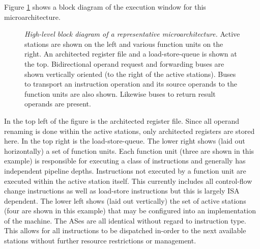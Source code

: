 \documentclass{book}
\begin{document}
Figure \ref{fig:overview} shows a block diagram
of the execution window for this microarchitecture.
%
%
\begin{figure}
\centerline{}
\caption[High-level block diagram of a representative microarchitecture]
{{\em High-level block diagram of a representative microarchitecture.}
Active stations are shown on the left and various function
units on the right.  An architected register file and a
load-store-queue is shown at the top.
Bidirectional operand request and forwarding buses are shown
vertically oriented (to the right of the active stations).
Buses to transport an instruction operation and its source operands
to the function units are also shown. 
Likewise buses to return result operands are present.}
\label{fig:overview}
\end{figure}
%
%
In the top left of the figure is the architected register file.
Since all operand renaming is done within the active stations,
only architected registers are stored here.
In the top right is the load-store-queue.
The lower right shows (laid out horizontally) a set of function units.
Each function unit (three are shown in this example)
is responsible for executing a class of
instructions and generally has independent pipeline depths.
Instructions not executed by a function unit
are executed within the active station itself.  This currently
includes all control-flow change instructions as well as load-store
instructions but this is largely ISA dependent.  
The lower left shows (laid out vertically) the set of
active stations (four are shown in this example)
that may be configured into an implementation of
the machine.
The ASes are all identical without regard to 
instruction type.  This allows for all instructions to be
dispatched in-order to the next available stations
without further resource restrictions or management.
\end{document}
